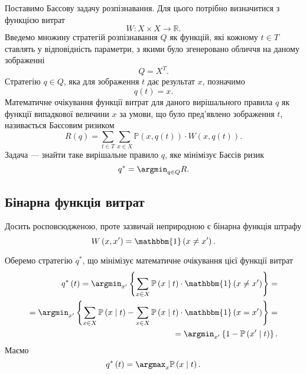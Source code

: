 Поставимо Баєсову задачу розпізнавання.
Для цього потрібно визначитися з функцією витрат
\cite{berger1980}
\begin{equation*}
  W: X \times X \rightarrow \mathbb{R}.
\end{equation*}
Введемо множину стратегій розпізнавання $Q$ як функцій,
які кожному $t \in T$ ставлять у відповідність параметри,
з якими було згенеровано обличчя на даному зображенні
\begin{equation*}
  Q = X^T.
\end{equation*}
Стратегію $q \in Q$, яка для зображення $t$ дає результат $x$, позначимо
\begin{equation*}
  q\left( t \right) = x.
\end{equation*}
Математичне очікування функції витрат для даного вирішального правила $q$
як функції випадкової величини $x$ за умови,
що було пред'явлено зображення $t$, називається Баєсовим ризиком
\begin{equation*}
  R \left( q \right)
  = \sum\limits_{t \in T} \sum\limits_{x \in X}
    \mathbb{P} \left( x,  q\left( t \right) \right)
    \cdot W \left( x, q\left( t \right) \right).
\end{equation*}
Задача --- знайти таке вирішальне правило $q$, яке мінімізує Баєсів ризик
\begin{equation*}
  q^* = \argmin_{q \in Q} R.
\end{equation*}

\subsection{Бінарна функція витрат}

Досить росповсюдженою, проте зазвичай неприродною є бінарна функція штрафу
\begin{equation*}
  W \left( x, x' \right)
  = \mathbbm{1} \left( x \neq x' \right).
\end{equation*}

Оберемо стратегію $q^*$,
що мінімізує математичне очікування цієї функції витрат
\begin{equation*}
  \begin{split}
    q^* \left( t \right)
    = \argmin_{x'} \left\{
      \sum\limits_{x \in X}
        \mathbb{P} \left( x \;\middle|\;  t \right)
        \cdot \mathbbm{1} \left( x \neq x' \right)
      \right\} = \\
    = \argmin_{x'} \left\{
      \sum\limits_{x \in X}
        \mathbb{P} \left( x \;\middle|\;  t \right)
      - \sum\limits_{x \in X}
        \mathbb{P} \left( x \;\middle|\;  t \right)
        \cdot \mathbbm{1} \left( x = x' \right)
      \right\} = \\
    = \argmin_{x'} \left\{
      1 - \mathbb{P} \left( x' \;\middle|\;  t \right)
      \right\}.
  \end{split}
\end{equation*}
Маємо
\begin{equation*}
  q^* \left( t \right)
  = \argmax_x \mathbb{P} \left( x \;\middle|\;  t \right).
\end{equation*}

